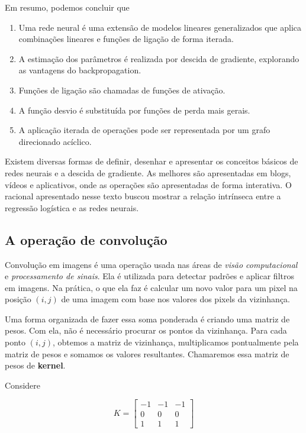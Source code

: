 \documentclass[12pt,]{report}
\providecommand{\tightlist}{%
  \setlength{\itemsep}{0pt}\setlength{\parskip}{0pt}}
\begin{document}
Em resumo, podemos concluir que

\begin{enumerate}
\def\labelenumi{\arabic{enumi}.}
\tightlist
\item
  Uma rede neural é uma extensão de modelos lineares generalizados que
  aplica combinações lineares e funções de ligação de forma iterada.
\item
  A estimação dos parâmetros é realizada por descida de gradiente,
  explorando as vantagens do backpropagation.
\item
  Funções de ligação são chamadas de funções de ativação.
\item
  A função desvio é substituída por funções de perda mais gerais.
\item
  A aplicação iterada de operações pode ser representada por um grafo
  direcionado acíclico.
\end{enumerate}

Existem diversas formas de definir, desenhar e apresentar os conceitos
básicos de redes neurais e a descida de gradiente. As melhores são
apresentadas em blogs, vídeos e aplicativos, onde as operações são
apresentadas de forma interativa. O racional apresentado nesse texto
buscou mostrar a relação intrínseca entre a regressão logística e as
redes neurais.

\subsection{A operação de convolução}\label{a-operacao-de-convolucao}

Convolução em imagens é uma operação usada nas áreas de \emph{visão
computacional} e \emph{processamento de sinais}. Ela é utilizada para
detectar padrões e aplicar filtros em imagens. Na prática, o que ela faz
é calcular um novo valor para um pixel na posição \((i,j)\) de uma
imagem com base nos valores dos pixels da vizinhança.

Uma forma organizada de fazer essa soma ponderada é criando uma matriz
de pesos. Com ela, não é necessário procurar os pontos da vizinhança.
Para cada ponto \((i,j)\), obtemos a matriz de vizinhança, multiplicamos
pontualmente pela matriz de pesos e somamos os valores resultantes.
Chamaremos essa matriz de pesos de \textbf{kernel}.

Considere

\[
K = \left[\begin{array}{rrr}-1&-1&-1\\0&0&0\\1&1&1\end{array}\right]
\]
\end{document}
